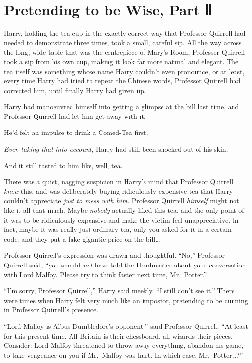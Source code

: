 \chapter{Pretending to be Wise, Part Ⅱ}

Harry, holding the tea cup in the exactly correct way that Professor
Quirrell had needed to demonstrate three times, took a small, careful
sip. All the way across the long, wide table that was the centrepiece of
Mary's Room, Professor Quirrell took a sip from his own cup, making it
look far more natural and elegant. The tea itself was something whose
name Harry couldn't even pronounce, or at least, every time Harry had
tried to repeat the Chinese words, Professor Quirrell had corrected him,
until finally Harry had given up.

Harry had manoeuvred himself into getting a glimpse at the bill last
time, and Professor Quirrell had let him get away with it.

He'd felt an impulse to drink a Comed-Tea first.

\emph{Even taking that into account}, Harry had still been shocked out
of his skin.

And it still tasted to him like, well, tea.

There was a quiet, nagging suspicion in Harry's mind that Professor
Quirrell \emph{knew} this, and was deliberately buying ridiculously
expensive tea that Harry couldn't appreciate \emph{just to mess with
him.} Professor Quirrell \emph{himself} might not like it all that much.
Maybe \emph{nobody} actually liked this tea, and the only point of it
was to be ridiculously expensive and make the victim feel
unappreciative. In fact, maybe it was really just ordinary tea, only you
asked for it in a certain code, and they put a fake gigantic price on
the bill\ldots{}

Professor Quirrell's expression was drawn and thoughtful. ``No,''
Professor Quirrell said, ``you should \emph{not} have told the
Headmaster about your conversation with Lord Malfoy. Please try to think
faster next time, Mr.~Potter.''

``I'm sorry, Professor Quirrell,'' Harry said meekly. ``I still don't
see it.'' There were times when Harry felt very much like an impostor,
pretending to be cunning in Professor Quirrell's presence.

``Lord Malfoy is Albus Dumbledore's opponent,'' said Professor Quirrell.
``At least for this present time. All Britain is their chessboard, all
wizards their pieces. Consider: Lord Malfoy threatened to throw away
everything, abandon his game, to take vengeance on you if Mr.~Malfoy was
hurt. In which case, Mr.~Potter\ldots{}?''

